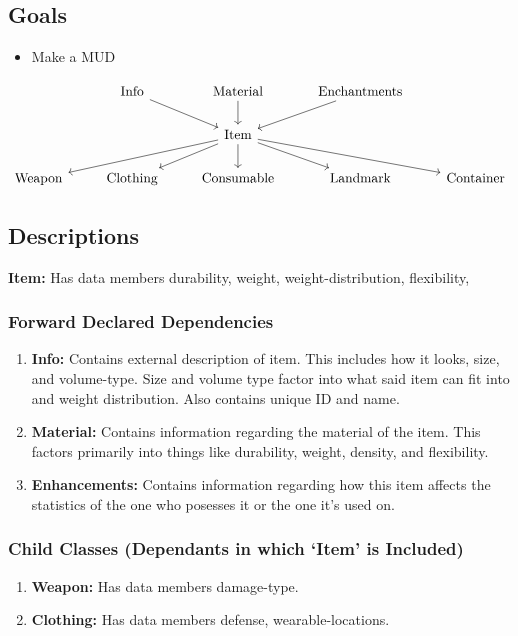 \documentclass{article}
\begin{document}
\subsection*{Goals}
\begin{itemize}
    \item Make a MUD
\end{itemize}

\begin{equation*} \label{g1}
\begin{tikzcd}
    & \text{Info} \arrow[dr] & \text{Material} \arrow[d]
    & \text{Enchantments} \arrow[dl] \\
    && \text{Item} \ar[dll] \ar[dl] \ar[d] \ar[dr] \ar[drr] \\
    \text{Weapon} & \text{Clothing} & \text{Consumable} & \text{Landmark} & \text{Container}
    \end{tikzcd}
\end{equation*}

\subsection*{Descriptions}
\textbf{Item:} Has data members durability, weight, weight-distribution, flexibility, 

\subsubsection*{Forward Declared Dependencies}
\begin{enumerate}
    \item \textbf{Info:} Contains external description of item. This
    includes how it looks, size, and volume-type. Size and volume type
    factor into what said item can fit into and weight distribution.  
    Also contains unique ID and name.

    \item \textbf{Material:} Contains information regarding the
    material of the item. This factors primarily into things like
    durability, weight, density, and flexibility. 

    \item \textbf{Enhancements:} Contains information regarding how
    this item affects the statistics of the one who posesses it or the
    one it's used on.
\end{enumerate}

\subsubsection*{Child Classes (Dependants in which `Item' is Included)}
\begin{enumerate}
    \item \textbf{Weapon:} Has data members damage-type.

    \item \textbf{Clothing:} Has data members defense, 
        wearable-locations.

\end{enumerate}
\end{document}
